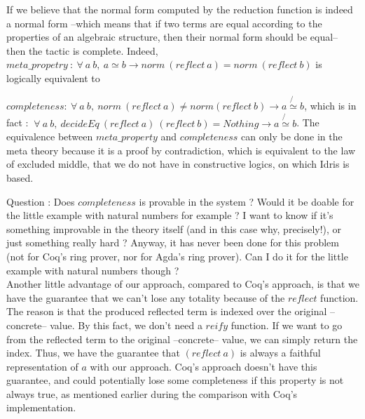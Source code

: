 If we believe that the normal form computed by the reduction function is indeed a normal form --which means that if two terms are equal according to the properties of an algebraic structure, then their normal form should be equal-- then the tactic is complete.
Indeed, 
$meta\_propetry\ :\ \forall\ a\ b,\ a \simeq b \rightarrow norm\ (reflect\ a) = norm\ (reflect\ b)$ is logically equivalent to

$completeness : \ \forall\ a\ b,\ norm\ (reflect\ a) \neq norm(reflect\ b) \rightarrow a \not{\simeq} b$, which is in fact :
$\ \forall\ a\ b,\ decideEq\ (reflect\ a)\ (reflect\ b) = Nothing \rightarrow a \not{\simeq} b$.
The equivalence between $meta\_property$ and $completeness$ can only be done in the meta theory because it is a proof by contradiction, which is equivalent to the law of excluded middle, that we do not have in constructive logics, on which Idris is based.

Question : Does $completeness$ is provable in the system ? Would it be doable for the little example with natural numbers for example ? I want to know if it's something improvable in the theory itself (and in this case why, precisely!), or just something really hard ?
Anyway, it has never been done for this problem (not for Coq's ring prover, nor for Agda's ring prover). Can I do it for the little example with natural numbers though ? \\

Another little advantage of our approach, compared to Coq's approach, is that we have the guarantee that we can't lose any totality because of the $reflect$ function. The reason is that the produced reflected term is indexed over the original --concrete-- value. By this fact, we don't need a $reify$ function. If we want to go from the reflected term to the original --concrete-- value, we can simply return the index. Thus, we have the guarantee that $(reflect\ a)$ is always a faithful representation of $a$ with our approach. Coq's approach doesn't have this guarantee, and could potentially lose some completeness if this property is not always true, as mentioned earlier during the comparison with Coq's implementation.
